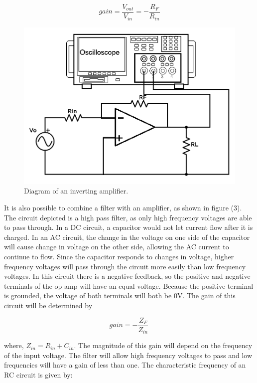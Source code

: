 \documentclass[twocolumn, amsmath]{revtex4}
\begin{document}
\begin{equation}
gain =  \frac{V_{out}}{V_{in}} = -\frac{R_{F}}{R_{in}}
\end{equation}


\begin{figure}[h]
    \includegraphics[scale=0.3]{inverting.png}  
    \caption{Diagram of an inverting amplifier.}
\end{figure}

It is also possible to combine a filter with an amplifier, as shown in figure (3). The circuit depicted is a high pass filter, as only high frequency voltages are able to pass through. In a DC circuit, a capacitor would not let current flow after it is charged. In an AC circuit, the change in the voltage on one side of the capacitor will cause change in voltage on the other side, allowing the AC current to continue to flow. 
Since the capacitor responds to changes in voltage, higher frequency voltages will pass through the circuit more easily than low frequency voltages. 
In this circuit there is a negative feedback, so the positive and negative terminals of the op amp will have an equal voltage. Because the positive terminal is grounded, the voltage of both terminals will both be 0V. The gain of this circuit will be determined by

\begin{equation}
gain =  -\frac{Z_{F}}{Z_{in}} \,
\end{equation}

where, $Z_{in} = R_{in} + C_{in}$. The magnitude of this gain will depend on the frequency of the input voltage. The filter will allow high frequency voltages to pass and low frequencies will have a gain of less than one. The characteristic frequency of an RC circuit is given by:
\end{document}
